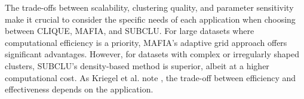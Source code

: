 The trade-offs between scalability, clustering quality, and parameter sensitivity make it crucial to consider the specific needs of each application when choosing between CLIQUE, MAFIA, and SUBCLU. For large datasets where computational efficiency is a priority, MAFIA's adaptive grid approach offers significant advantages. However, for datasets with complex or irregularly shaped clusters, SUBCLU's density-based method is superior, albeit at a higher computational cost. As Kriegel et al. note \cite[p.1:50]{kriegel-2009}, the trade-off between efficiency and effectiveness depends on the application.